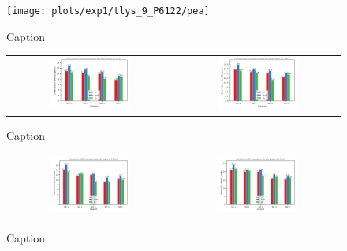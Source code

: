 \begin{figure}
    \centering
    \texttt{[image: plots/exp1/tlys\_9\_P6122/pea]}
    \caption{Caption}
    \label{fig:enter-label}
\end{figure}



\begin{figure}
    \centering
    \begin{tabular}{cc}
        \includegraphics[width = 0.5\textwidth]{plots/exp1/tlys_2_P6122/peaks/3p0_m120_2Dbar.png} & \includegraphics[width = 0.5\textwidth]{plots/exp1/tlys_2_P6122/peaks/3p0_m205_2Dbar.png}
    \end{tabular}
    \caption{Caption}
    \label{fig:tlys2_met_peaks_3p0}
\end{figure}

\begin{figure}
    \centering
    \begin{tabular}{cc}
        \includegraphics[width = 0.5\textwidth]{plots/exp1/tlys_2_P6122/peaks/3p5_m120_2Dbar.png} & \includegraphics[width = 0.5\textwidth]{plots/exp1/tlys_2_P6122/peaks/3p5_m205_2Dbar.png}
    \end{tabular}
    \caption{Caption}
    \label{fig:tlys2_met_peaks_3p5}
\end{figure}

